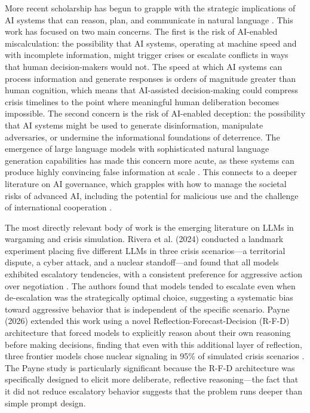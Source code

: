 \documentclass[12pt]{article}
\theoremstyle{plain}
\theoremstyle{definition}
\begin{document}
More recent scholarship has begun to grapple with the strategic implications of AI systems that can reason, plan, and communicate in natural language \citep{Johnson2020}. This work has focused on two main concerns. The first is the risk of AI-enabled miscalculation: the possibility that AI systems, operating at machine speed and with incomplete information, might trigger crises or escalate conflicts in ways that human decision-makers would not. The speed at which AI systems can process information and generate responses is orders of magnitude greater than human cognition, which means that AI-assisted decision-making could compress crisis timelines to the point where meaningful human deliberation becomes impossible. The second concern is the risk of AI-enabled deception: the possibility that AI systems might be used to generate disinformation, manipulate adversaries, or undermine the informational foundations of deterrence. The emergence of large language models with sophisticated natural language generation capabilities has made this concern more acute, as these systems can produce highly convincing false information at scale \citep{KrepsMcCain2022, Ferrara2024}. This connects to a deeper literature on AI governance, which grapples with how to manage the societal risks of advanced AI, including the potential for malicious use and the challenge of international cooperation \citep{Dafoe2020, Russell2019, Ord2020}.

The most directly relevant body of work is the emerging literature on LLMs in wargaming and crisis simulation. Rivera et al. (2024) conducted a landmark experiment placing five different LLMs in three crisis scenarios---a territorial dispute, a cyber attack, and a nuclear standoff---and found that all models exhibited escalatory tendencies, with a consistent preference for aggressive action over negotiation \citep{Rivera2024}. The authors found that models tended to escalate even when de-escalation was the strategically optimal choice, suggesting a systematic bias toward aggressive behavior that is independent of the specific scenario. Payne (2026) extended this work using a novel Reflection-Forecast-Decision (R-F-D) architecture that forced models to explicitly reason about their own reasoning before making decisions, finding that even with this additional layer of reflection, three frontier models chose nuclear signaling in 95\% of simulated crisis scenarios \citep{Payne2026}. The Payne study is particularly significant because the R-F-D architecture was specifically designed to elicit more deliberate, reflective reasoning---the fact that it did not reduce escalatory behavior suggests that the problem runs deeper than simple prompt design.
\end{document}
